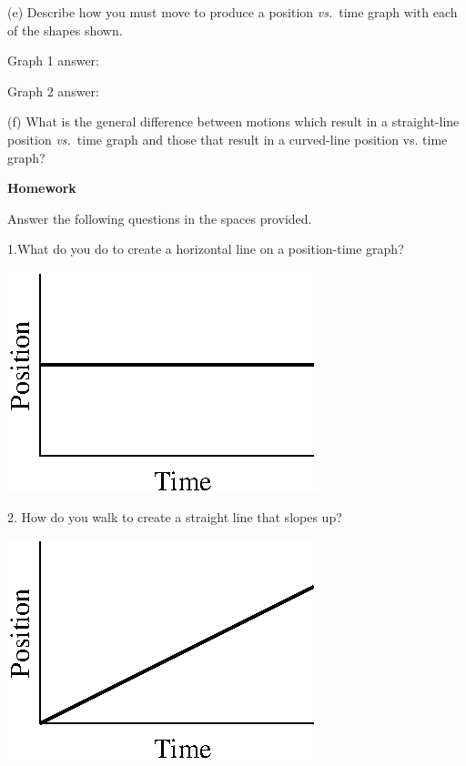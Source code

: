 (e) Describe how you must move to produce a position \textit{vs.}~time graph with each
of the shapes shown.

Graph 1 answer:
\answerspace{10mm}

Graph 2 answer:
\answerspace{10mm}

(f) What is the general difference between motions which result in a straight-line
position \textit{vs.}~time graph and those that result in a curved-line position vs.
time graph?
\answerspace{20mm}

\pagebreak[2]
\textbf{Homework} 

Answer the following questions in the spaces provided.

1.What do you do to create a horizontal line on a position-time graph?

\vspace{0.3cm}
{\par\raggedright \includegraphics{position/position_fig5.eps} \par}
\vspace{0.3cm}

2. How do you walk to create a straight line that slopes up?

\vspace{0.3cm}
{\par\raggedright \includegraphics{position/position_fig6.eps} \par}
\vspace{0.3cm}

